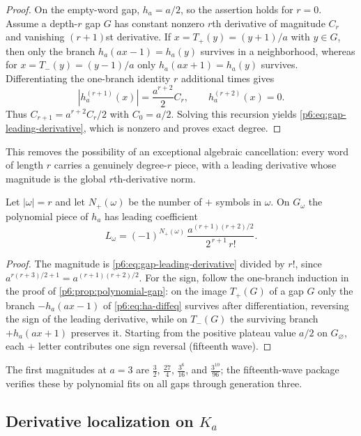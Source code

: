\documentclass[11pt,oneside]{article}
\numberwithin{equation}{section}
\theoremstyle{definition}
\theoremstyle{remark}
\begin{document}
\begin{proof}
On the empty-word gap, $h_a=a/2$, so the assertion holds for $r=0$.
Assume a depth-$r$ gap $G$ has constant nonzero $r$th derivative of magnitude
$C_r$ and vanishing $(r+1)$st derivative.  If $x=T_+(y)=(y+1)/a$ with $y\in G$,
then only the branch $h_a(ax-1)=h_a(y)$ survives in a neighborhood, whereas for
$x=T_-(y)=(y-1)/a$ only $h_a(ax+1)=h_a(y)$ survives.  Differentiating the
one-branch identity $r$ additional times gives
\[
 |h_a^{(r+1)}(x)|=\frac{a^{r+2}}2 C_r,
 \qquad h_a^{(r+2)}(x)=0.
\]
Thus $C_{r+1}=a^{r+2}C_r/2$ with $C_0=a/2$.  Solving this recursion yields
\eqref{p6:eq:gap-leading-derivative}, which is nonzero and proves exact degree.
\end{proof}

This removes the possibility of an exceptional algebraic cancellation: every
word of length $r$ carries a genuinely degree-$r$ piece, with a leading
derivative whose magnitude is the global $r$th-derivative norm.

\begin{corollary}\label{p6:cor:signed-leading}
Let $|\omega|=r$ and let $N_+(\omega)$ be the number of $+$ symbols in
$\omega$.  On $G_\omega$ the polynomial piece of $h_a$ has leading coefficient
\begin{equation}\label{p6:eq:signed-leading}
 L_\omega=(-1)^{N_+(\omega)}\,
 \frac{a^{(r+1)(r+2)/2}}{2^{\,r+1}\,r!}.
\end{equation}
\end{corollary}

\begin{proof}
The magnitude is \eqref{p6:eq:gap-leading-derivative} divided by $r!$, since
$a^{r(r+3)/2+1}=a^{(r+1)(r+2)/2}$.  For the sign, follow the one-branch
induction in the proof of \cref{p6:prop:polynomial-gap}: on the image
$T_+(G)$ of a gap $G$ only the branch $-h_a(ax-1)$ of
\eqref{p6:eq:ha-diffeq} survives after differentiation, reversing the sign of
the leading derivative, while on $T_-(G)$ the surviving branch $+h_a(ax+1)$
preserves it.  Starting from the positive plateau value $a/2$ on
$G_\varnothing$, each $+$ letter contributes one sign reversal (fifteenth
wave).
\end{proof}

The first magnitudes at $a=3$ are $\tfrac32$, $\tfrac{27}4$,
$\tfrac{3^6}{16}$, and $\tfrac{3^{10}}{96}$; the fifteenth-wave package
verifies these by polynomial fits on all gaps through generation three.

\subsection{Derivative localization on \texorpdfstring{$K_a$}{K-a}}
\end{document}
